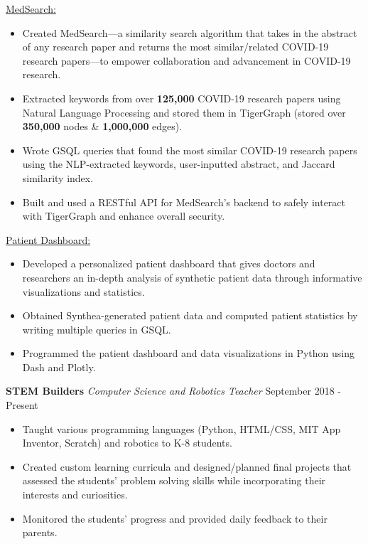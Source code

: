 \documentclass[11pt]{res}
\begin{document}
\begin{footnotesize}
\begin{resume}
\vspace{-4mm}
\underline{MedSearch:}
\vspace{-5.10mm}
\begin{itemize} \itemsep -2pt 
\item Created MedSearch—a similarity search algorithm that takes in the abstract of any research paper and returns the most similar/related COVID-19 research papers—to empower collaboration and advancement in COVID-19 research. 
\vspace{1mm}
\item Extracted keywords from over \textbf{125,000} COVID-19 research papers using Natural Language Processing and stored them in TigerGraph (stored over \textbf{350,000} nodes \& \textbf{1,000,000} edges).
\vspace{1mm}
\item Wrote GSQL queries that found the most similar COVID-19 research papers using the NLP-extracted keywords, user-inputted abstract, and Jaccard similarity index.
\vspace{1mm}
\item Built and used a RESTful API for MedSearch's backend to safely interact with TigerGraph and enhance overall security.
\end{itemize}
\vspace{-4.75mm}
\underline{Patient Dashboard:}
\vspace{-5.10mm}
\begin{itemize} \itemsep -2pt 
\item Developed a personalized patient dashboard that gives doctors and researchers an in-depth analysis of synthetic patient data through informative visualizations and statistics. 
\vspace{1mm}
\item Obtained Synthea-generated patient data and computed patient statistics by writing multiple queries in GSQL.
\vspace{1mm}
\item Programmed the patient dashboard and data visualizations in Python using Dash and Plotly.
\end{itemize}
\vspace{-2mm}
\textbf{STEM Builders} {\sl Computer Science and Robotics Teacher} \hfill September 2018 - Present\vspace{-5.25mm}
\begin{itemize} \itemsep -2pt 
\item Taught various programming languages (Python, HTML/CSS, MIT App Inventor, Scratch) and robotics to K-8 students. 
\vspace{1mm}
\item Created custom learning curricula and designed/planned final projects that assessed the students' problem solving skills while incorporating their interests and curiosities. 
\vspace{1mm}
\item Monitored the students' progress and provided daily feedback to their parents.
\end{itemize}

\end{resume}
\end{footnotesize}
\end{document}
